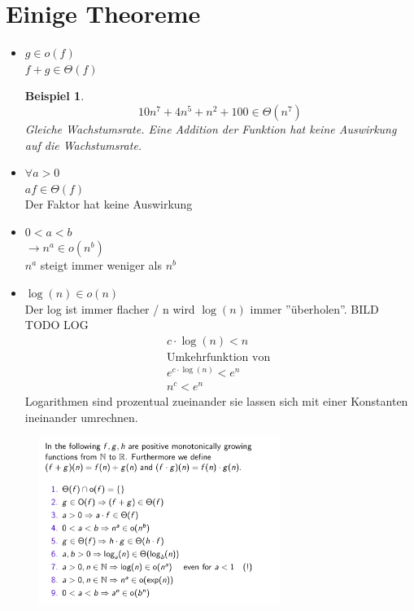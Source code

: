 \documentclass[a4paper,10pt]{report}
\newtheorem{myexample}{Beispiel}
\begin{document}
\section{Einige Theoreme}
\begin{itemize}
	\item
	$g \in o(f)$\\
	$f+g\in \Theta(f)$
	\begin{myexample}
		\begin{equation*}10n^7 + 4n^5 + n^2 + 100 \in \Theta(n^7)\end{equation*}
		Gleiche Wachstumsrate.
		Eine Addition der Funktion hat keine Auswirkung auf die Wachstumsrate.
	\end{myexample}
	\item
	$\forall a > 0$\\
	$af\in \Theta(f)$\\
	Der Faktor hat keine Auswirkung
	\item
	$0 < a <b$ \\
	$\to n^a \in o(n^b)$ \\
	$n^a$ steigt immer weniger als $n^b$
	\item
	$\log(n) \in o(n)$\\
	Der log ist immer flacher / n wird $\log(n)$ immer ''überholen''.
	BILD TODO LOG
	\begin{eqnarray*}
		c \cdot \log(n) < n\\
		\text{Umkehrfunktion von }\\
		e^{c \cdot \log(n)} < e^n\\
		n^c < e^n
	\end{eqnarray*}
	Logarithmen sind prozentual zueinander sie lassen sich mit einer Konstanten ineinander umrechnen.
\end{itemize}
\begin{figure}[H]
	\begin{center}
  		\includegraphics[width=0.7\textwidth]{img/landautheoreme.png}
	\end{center}
\end{figure}
\newpage
\end{document}
